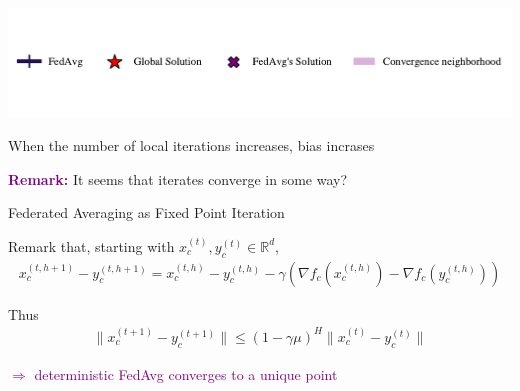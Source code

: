 \documentclass[aspectratio=169,12pt]{beamer}
\begin{document}
\begin{frame}[t]
\begin{center}
\vspace{-3em}

\includegraphics[width=0.8\linewidth]{images/legend_fedavg.pdf}    
    
  \end{center}

  \vspace{-3em}

  \begin{center}
    When the number of local iterations increases, bias incrases
    
  \vspace{-0.5em}

    \pause
    
    


  \vspace{-0.5em}
  
  \textcolor{purple}{\bfseries Remark:} It seems that iterates converge in some way?
  \end{center}
  
\end{frame}

\begin{frame}{Federated Averaging as Fixed Point Iteration}

    Remark that, starting with $x_c^{(t)}, y_c^{(t)} \in \mathbb{R}^d$,
    \begin{align*}
        x_c^{(t,h+1)} - 
        y_c^{(t,h+1)}
        =
        x_c^{(t,h)} -
        y_c^{(t,h)}
        - \gamma ( \nabla f_c( x_c^{(t,h)} ) - \nabla f_c(y_c^{(t,h)}) )
    \end{align*}

    Thus
    \begin{align*}
    \| x_c^{(t+1)} - y_c^{(t+1)} \|
    \le
    (1 - \gamma \mu)^H \| x_c^{(t)} - y_c^{(t)} \|
    \end{align*}

    \pause

\begin{center}
\large 
    \textcolor{purple}{$\Rightarrow$ deterministic FedAvg converges to a unique point} 
\end{center}
\end{frame}
\end{document}
